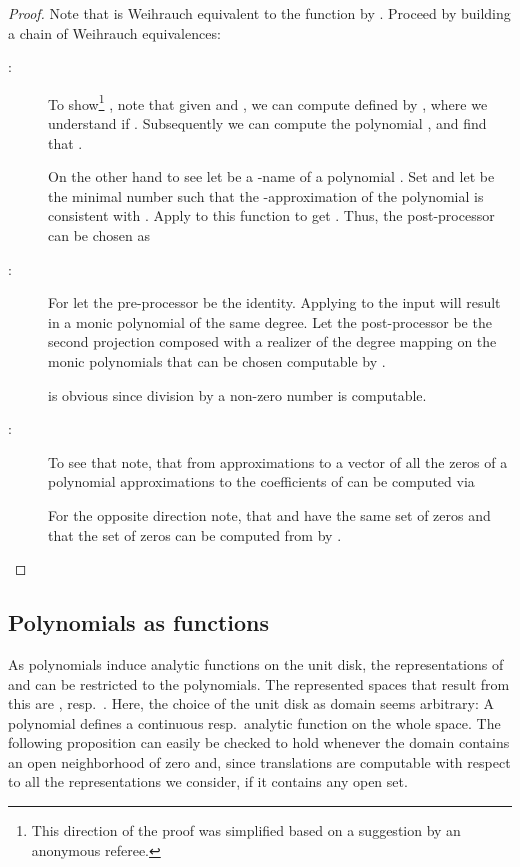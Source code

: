 \documentclass{eptcs-modified}
\begin{document}
			\begin{proof}
				Note that   is Weihrauch equivalent to the function  by .
				Proceed by building a chain of Weihrauch equivalences:
				\begin{description}
					\item[:]
					To show\footnote{This direction of the proof was simplified based on a suggestion by an anonymous referee.} , note that given  and , we can compute  defined by , where we understand  if . Subsequently we can compute the polynomial , and find that .

          On the other hand to see  let  be a -name of a polynomial .
          Set  and let  be the minimal number such that the -approximation of the polynomial is consistent with .
          Apply  to this function to get .
          Thus, the post-processor  can be chosen as 
					\item[:]
					For  let the pre-processor be the identity.
					Applying  to the input will result in a monic polynomial of the same degree.
					Let the post-processor be the second projection composed with a realizer of the degree mapping on the monic polynomials that can be chosen computable by .

					 is obvious since division by a non-zero number is computable.
					\item[:]
					To see that  note, that from approximations to a vector  of all the zeros of a polynomial  approximations to the coefficients of  can be computed via
					

					For the opposite direction note, that  and  have the same set of zeros and that the set of zeros can be computed from  by .
				\end{description}
			\end{proof}

		\subsection{Polynomials as functions}\label{sec:sub:polynomials as functions}

			As polynomials induce analytic functions on the unit disk, the representations of  and  can be restricted to the polynomials.
			The represented spaces that result from this are , resp.\ .
			Here, the choice of the unit disk  as domain seems arbitrary: A polynomial defines a continuous resp.\ analytic function on the whole space.
			The following proposition can easily be checked to hold whenever the domain contains an open neighborhood of zero and, since translations are computable with respect to all the representations we consider, if it contains any open set.
\end{document}
